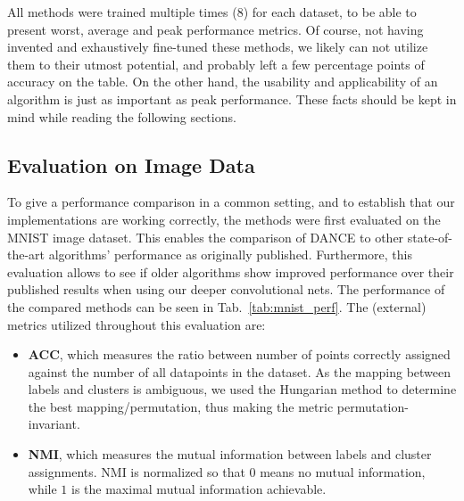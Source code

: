			All methods were trained multiple times ($8$) for each dataset, to be able to present worst, average and peak performance metrics.
			Of course, not having invented and exhaustively fine-tuned these methods, we likely can not utilize them to their utmost potential, and probably left a few percentage points of accuracy on the table.
			On the other hand, the usability and applicability of an algorithm is just as important as peak performance.
			These facts should be kept in mind while reading the following sections.
			
		\subsection{Evaluation on Image Data}
			
			To give a performance comparison in a common setting, and to establish that our implementations are working correctly, the methods were first evaluated on the MNIST image dataset.
			This enables the comparison of \ac{DANCE} to other state-of-the-art algorithms' performance as originally published.
			Furthermore, this evaluation allows to see if older algorithms show improved performance over their published results when using our deeper convolutional nets.
			The performance of the compared methods can be seen in Tab.~\ref{tab:mnist_perf}.
			The (external) metrics utilized throughout this evaluation are:
			\begin{itemize}
				\item \textbf{\ac{ACC}}, which measures the ratio between number of points correctly assigned against the number of all datapoints in the dataset.
				As the mapping between labels and clusters is ambiguous, we used the Hungarian method \cite{hungarian} to determine the best mapping/permutation, thus making the metric permutation-invariant.
				\item \textbf{\ac{NMI}}, which measures the mutual information between labels and cluster assignments.
				\ac{NMI} is normalized so that $0$ means no mutual information, while $1$ is the maximal mutual information achievable.
			\end{itemize}
			
			
